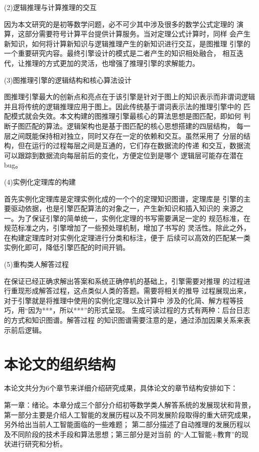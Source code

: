 \documentclass{standalone}
\begin{document}
(2)逻辑推理与计算推理的交互

因为本文研究的是初等数学问题，必不可少其中涉及很多的数学公式定理的
演算，这部分需要符号计算平台提供计算服务。当对定理公式计算时，同样
会产生新知识，如何将计算新知识与逻辑推理产生的新知识进行交互，是图推理
引擎的一个重要研究内容。最终引擎设计的模式是二者产生的知识相处融合，
相互迭代，让推理的方式更加的灵活，也增强了推理引擎的求解能力。

(3)图推理引擎的逻辑结构和核心算法设计

图推理引擎最大的创新点和亮点在于该引擎是针对于图上的知识表示而非谓词逻辑
并且将传统的逻辑推理应用于图上。因此传统基于谓词表示法的推理引擎中的
匹配模式就会失效。本文构建的图推理引擎最核心的算法思想是图匹配，即如何
判断子图匹配的算法。逻辑架构也是基于图匹配的核心思想搭建的四层结构，
每一层之间既能保持相对独立，同时又存在一定的依赖和交互。虽然采用了
分层的结构，但在运行的过程每层之间是互通的，它们存在数据流的传递
和交互，数据流可以跟踪到数据流向每层前后的变化，方便定位到是哪个
逻辑层可能存在潜在bug。

(4)实例化定理库的构建

首先实例化定理库是定理实例化成的一个个的定理知识图谱，定理库是
引擎的主要驱动依据，也是引擎匹配算法的对象之一，产生新知识和插入知识的
来源之一。为了保证引擎的简单统一，实例化定理的书写需要满足一定的
规范标准，在规范标准之内，引擎增加了一些预处理机制，增加了书写的
灵活性。除此之外，在构建定理库时对实例化定理进行分类和标注，便于
后续可以高效的匹配某一类实例化即可，降低引擎匹配的时间开销。

(5)重构类人解答过程

在保证已经正确求解出答案和系统正确停机的基础上，引擎需要对推理
的过程进行重现形成解答过程，这点类似人类的答题。需要将相关的推导
过程展现出来，对于引擎就是将推理中使用的实例化定理以及计算中
涉及的化简、解方程等技巧，用“因为***，所以***”的形式呈现。
生成可读过程的方式有两种：后台日志的方式和知识图谱。解答过程
的知识图谱需要注意的是，通过添加因果关系来表示前后逻辑。
\section{本论文的组织结构}
本论文共分为6个章节来详细介绍研究成果，具体论文的章节结构安排如下：

第一章：绪论。本章分成三个部分介绍初等数学类人解答系统的发展现状和背景，
第一部分主要是介绍人工智能的发展历程以及不同发展阶段取得的重大研究成果，另外给出当前人工智能面临的一些难题；
第二部分描述了自动推理的发展历程以及不同阶段的技术手段和算法思想；第三部分是对当前
的“人工智能+教育”的现状进行研究和分析。
\end{document}
